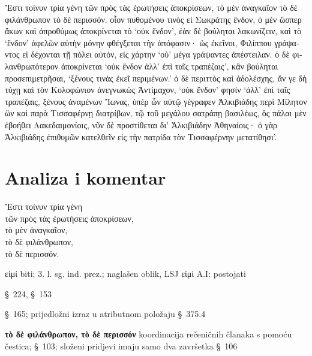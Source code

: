 {\large
\begin{greek}
\noindent  Ἔστι τοίνυν τρία γένη τῶν πρὸς τὰς ἐρωτήσεις ἀποκρίσεων, τὸ μὲν ἀναγκαῖον τὸ δὲ φιλάνθρωπον τὸ δὲ περισσόν. οἷον πυθομένου τινὸς εἰ Σωκράτης ἔνδον, ὁ μὲν ὥσπερ ἄκων καὶ ἀπροθύμως ἀποκρίνεται τὸ ‘οὐκ ἔνδον’, ἐὰν δὲ βούληται λακωνίζειν, καὶ τὸ ‘ἔνδον’ ἀφελὼν αὐτὴν μόνην φθέγξεται τὴν ἀπόφασιν· ὡς ἐκεῖνοι, Φιλίππου γράψαντος εἰ δέχονται τῇ πόλει αὐτόν, εἰς χάρτην ‘οὐ’ μέγα γράψαντες ἀπέστειλαν. ὁ δὲ φιλανθρωπότερον ἀποκρίνεται ‘οὐκ ἔνδον ἀλλ' ἐπὶ ταῖς τραπέζαις’, κἂν βούληται προσεπιμετρῆσαι, ‘ξένους τινὰς ἐκεῖ περιμένων.’ ὁ δὲ περιττὸς καὶ ἀδολέσχης, ἄν γε δὴ τύχῃ καὶ τὸν Κολοφώνιον ἀνεγνωκὼς Ἀντίμαχον, ‘οὐκ ἔνδον’ φησίν ‘ἀλλ' ἐπὶ ταῖς τραπέζαις, ξένους ἀναμένων  Ἴωνας, ὑπὲρ ὧν αὐτῷ γέγραφεν Ἀλκιβιάδης περὶ Μίλητον ὢν καὶ παρὰ Τισσαφέρνῃ διατρίβων, τῷ τοῦ μεγάλου σατράπῃ βασιλέως, ὃς πάλαι μὲν ἐβοήθει Λακεδαιμονίοις, νῦν δὲ προστίθεται δι' Ἀλκιβιάδην Ἀθηναίοις· ὁ γὰρ Ἀλκιβιάδης ἐπιθυμῶν κατελθεῖν εἰς τὴν πατρίδα τὸν Τισσαφέρνην μετατίθησι’.

\end{greek}
}


\section*{Analiza i komentar}



{\large
\begin{greek}
\noindent  Ἔστι τοίνυν τρία γένη \\
\tabto{2em} τῶν πρὸς τὰς ἐρωτήσεις ἀποκρίσεων, \\
τὸ μὲν ἀναγκαῖον, \\
τὸ δὲ φιλάνθρωπον, \\
τὸ δὲ περισσόν.\\

\end{greek}
}

\begin{description}[noitemsep] 
\item[ Ἔστι] εἰμί biti; 3. l. sg. ind. prez.; naglašen oblik, LSJ εἰμί A.I: postojati
\item[τρία γένη] §~224, §~153
\item[τῶν πρὸς τὰς ἐρωτήσεις ἀποκρίσεων] §~165; prijedložni izraz u atributnom položaju §~375.4
\item[τὸ μὲν ἀναγκαῖον,] \textbf{τὸ δὲ φιλάνθρωπον, τὸ δὲ περισσόν} koordinacija rečeničnih članaka s pomoću čestica; §~103; složeni pridjevi imaju samo dva završetka §~106

\end{description}

